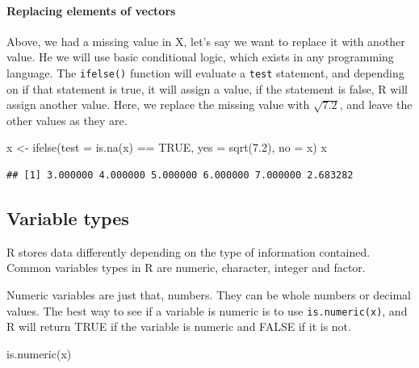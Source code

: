 \documentclass[
]{article}
\newenvironment{Shaded}{\begin{snugshade}}{\end{snugshade}}
\newcommand{\AttributeTok}[1]{\textcolor[rgb]{0.77,0.63,0.00}{#1}}
\newcommand{\ConstantTok}[1]{\textcolor[rgb]{0.00,0.00,0.00}{#1}}
\newcommand{\FloatTok}[1]{\textcolor[rgb]{0.00,0.00,0.81}{#1}}
\newcommand{\FunctionTok}[1]{\textcolor[rgb]{0.00,0.00,0.00}{#1}}
\newcommand{\NormalTok}[1]{#1}
\newcommand{\OtherTok}[1]{\textcolor[rgb]{0.56,0.35,0.01}{#1}}
\newcommand{\SpecialCharTok}[1]{\textcolor[rgb]{0.00,0.00,0.00}{#1}}
\begin{document}
\hypertarget{replacing-elements-of-vectors}{%
\paragraph{Replacing elements of vectors}\label{replacing-elements-of-vectors}}

Above, we had a missing value in X, let's say we want to replace it with
another value. He we will use basic conditional logic, which exists in
any programming language. The \texttt{ifelse()} function will evaluate a \texttt{test}
statement, and depending on if that statement is true, it will assign a
value, if the statement is false, R will assign another value. Here, we
replace the missing value with \(\sqrt{7.2}\), and leave the other values
as they are.

\begin{Shaded}
\begin{Highlighting}[]
\NormalTok{x }\OtherTok{\textless{}{-}} \FunctionTok{ifelse}\NormalTok{(}\AttributeTok{test =} \FunctionTok{is.na}\NormalTok{(x) }\SpecialCharTok{==} \ConstantTok{TRUE}\NormalTok{,}
            \AttributeTok{yes =}  \FunctionTok{sqrt}\NormalTok{(}\FloatTok{7.2}\NormalTok{),}
            \AttributeTok{no =}\NormalTok{  x)}
\NormalTok{x}
\end{Highlighting}
\end{Shaded}

\begin{verbatim}
## [1] 3.000000 4.000000 5.000000 6.000000 7.000000 2.683282
\end{verbatim}

\hypertarget{variable-types}{%
\subsection{Variable types}\label{variable-types}}

R stores data differently depending on the type of information
contained. Common variables types in R are numeric, character, integer
and factor.

Numeric variables are just that, numbers. They can be whole numbers or
decimal values. The best way to see if a variable is numeric is to use
\texttt{is.numeric(x)}, and R will return TRUE if the variable is numeric and
FALSE if it is not.

\begin{Shaded}
\begin{Highlighting}[]
\FunctionTok{is.numeric}\NormalTok{(x)}
\end{Highlighting}
\end{Shaded}
\end{document}
